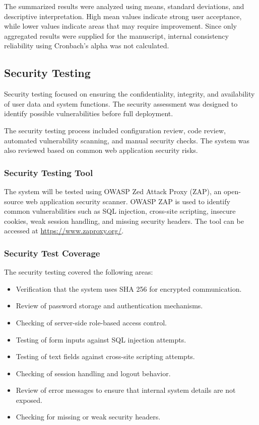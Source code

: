 The summarized results were analyzed using means, standard deviations, and descriptive interpretation. High mean values indicate strong user acceptance, while lower values indicate areas that may require improvement. Since only aggregated results were supplied for the manuscript, internal consistency reliability using Cronbach's alpha was not calculated.

\subsection{Security Testing}

Security testing focused on ensuring the confidentiality, integrity, and availability of user data and system functions. The security assessment was designed to identify possible vulnerabilities before full deployment.

The security testing process included configuration review, code review, automated vulnerability scanning, and manual security checks. The system was also reviewed based on common web application security risks.

\subsubsection{Security Testing Tool}

The system will be tested using OWASP Zed Attack Proxy (ZAP), an open-source web application security scanner. OWASP ZAP is used to identify common vulnerabilities such as SQL injection, cross-site scripting, insecure cookies, weak session handling, and missing security headers. The tool can be accessed at \href{https://www.zaproxy.org/}{https://www.zaproxy.org/}.

\subsubsection{Security Test Coverage}

The security testing covered the following areas:

\begin{itemize}
    \item Verification that the system uses SHA 256 for encrypted communication.
    \item Review of password storage and authentication mechanisms.
    \item Checking of server-side role-based access control.
    \item Testing of form inputs against SQL injection attempts.
    \item Testing of text fields against cross-site scripting attempts.
    \item Checking of session handling and logout behavior.
    \item Review of error messages to ensure that internal system details are not exposed.
    \item Checking for missing or weak security headers.
\end{itemize}

